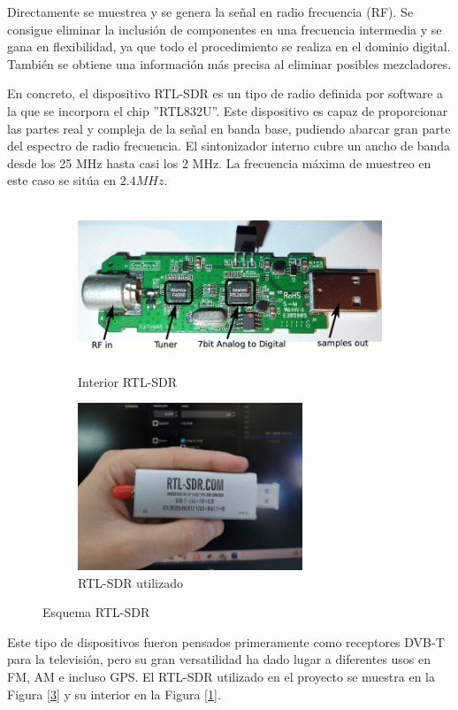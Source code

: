 \documentclass[a4paper,openright,12pt]{article}
\begin{document}
Directamente se muestrea y se genera la señal en radio frecuencia (RF). Se consigue eliminar la inclusión de componentes en una frecuencia intermedia y se gana en flexibilidad, ya que todo el procedimiento se realiza en el dominio digital. También se obtiene una información más precisa al eliminar posibles mezcladores.

	 En concreto, el dispositivo RTL-SDR es un tipo de radio definida por software a la que se incorpora el chip ''RTL832U''. Este dispositivo es capaz de proporcionar las partes real y compleja de la señal en banda base, pudiendo abarcar gran parte del espectro de radio frecuencia. El sintonizador interno cubre un ancho de banda desde los 25 MHz hasta casi los 2 MHz. La frecuencia máxima de muestreo en este caso se sitúa en $2.4 MHz$.
	 
	 \begin{figure}[H]
  \begin{subfigure}[b]{0.49\textwidth}
    \includegraphics[width=\textwidth, height=5cm]{imagenes/inner_RTL.JPG}
    \caption{Interior RTL-SDR}
    \label{inner_RTL}
  \end{subfigure}
  \hfill
  \begin{subfigure}[b]{0.49\textwidth}
    \includegraphics[width=\textwidth, height=5cm]{imagenes/rtl.JPG}
    \caption{RTL-SDR utilizado}
    \label{rtl}
  \end{subfigure}
  \caption{Esquema RTL-SDR}
\end{figure}

Este tipo de dispositivos fueron pensados primeramente como receptores DVB-T para la televisión, pero su gran versatilidad ha dado lugar a diferentes usos en FM, AM e incluso GPS.
El RTL-SDR utilizado en el proyecto se muestra en la Figura [\ref{rtl}] y su interior en la Figura [\ref{inner_RTL}].
\newpage
\end{document}
